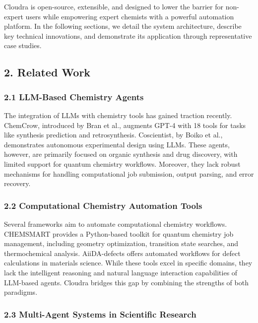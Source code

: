 Cloudra is open-source, extensible, and designed to lower the barrier
for non-expert users while empowering expert chemists with a powerful
automation platform. In the following sections, we detail the system
architecture, describe key technical innovations, and demonstrate its
application through representative case studies.

\hypertarget{related-work}{%
\subsection{2. Related Work}\label{related-work}}

\hypertarget{llm-based-chemistry-agents}{%
\subsubsection{2.1 LLM-Based Chemistry
Agents}\label{llm-based-chemistry-agents}}

The integration of LLMs with chemistry tools has gained traction
recently. ChemCrow, introduced by Bran et al., augments GPT-4 with 18
tools for tasks like synthesis prediction and retrosynthesis.
Coscientist, by Boiko et al., demonstrates autonomous experimental
design using LLMs. These agents, however, are primarily focused on
organic synthesis and drug discovery, with limited support for quantum
chemistry workflows. Moreover, they lack robust mechanisms for handling
computational job submission, output parsing, and error recovery.

\hypertarget{computational-chemistry-automation-tools}{%
\subsubsection{2.2 Computational Chemistry Automation
Tools}\label{computational-chemistry-automation-tools}}

Several frameworks aim to automate computational chemistry workflows.
CHEMSMART provides a Python-based toolkit for quantum chemistry job
management, including geometry optimization, transition state searches,
and thermochemical analysis. AiiDA-defects offers automated workflows
for defect calculations in materials science. While these tools excel in
specific domains, they lack the intelligent reasoning and natural
language interaction capabilities of LLM-based agents. Cloudra bridges
this gap by combining the strengths of both paradigms.

\hypertarget{multi-agent-systems-in-scientific-research}{%
\subsubsection{2.3 Multi-Agent Systems in Scientific
Research}\label{multi-agent-systems-in-scientific-research}}

